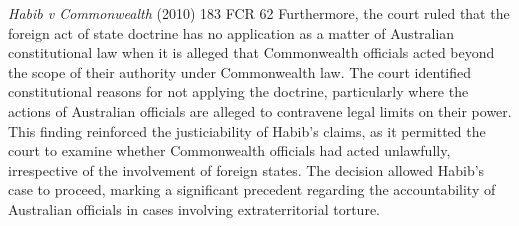 \begin{casedetails}{\textit{Habib v Commonwealth} (2010) 183 FCR 62}
    Furthermore, the court ruled that the foreign act of state doctrine has no application as a matter of Australian constitutional law when it is alleged that Commonwealth officials acted beyond the scope of their authority under Commonwealth law. The court identified constitutional reasons for not applying the doctrine, particularly where the actions of Australian officials are alleged to contravene legal limits on their power. This finding reinforced the justiciability of Habib's claims, as it permitted the court to examine whether Commonwealth officials had acted unlawfully, irrespective of the involvement of foreign states. The decision allowed Habib's case to proceed, marking a significant precedent regarding the accountability of Australian officials in cases involving extraterritorial torture.
\end{casedetails}

